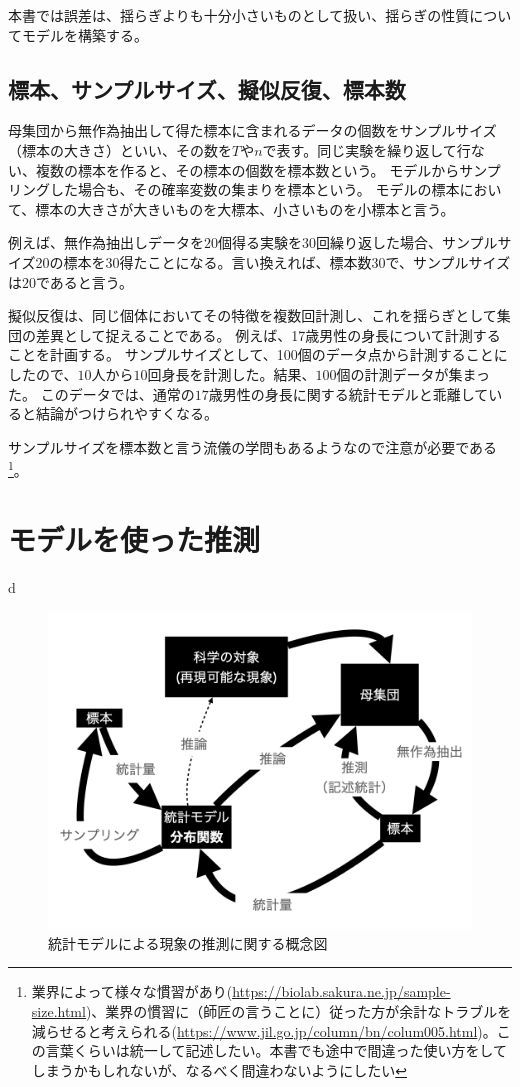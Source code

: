 本書では誤差は、揺らぎよりも十分小さいものとして扱い、揺らぎの性質についてモデルを構築する。

\subsection{標本、サンプルサイズ、擬似反復、標本数}
\begin{defi}
母集団から無作為抽出して得た標本に含まれるデータの個数をサンプルサイズ（標本の大きさ）といい、その数を$T$や$n$で表す。同じ実験を繰り返して行ない、複数の標本を作ると、その標本の個数を標本数という。
モデルからサンプリングした場合も、その確率変数の集まりを標本という。
モデルの標本において、標本の大きさが大きいものを大標本、小さいものを小標本と言う。
\end{defi}
例えば、無作為抽出しデータを$20$個得る実験を30回繰り返した場合、サンプルサイズ$20$の標本を$30$得たことになる。言い換えれば、標本数$30$で、サンプルサイズは$20$であると言う。


擬似反復は、同じ個体においてその特徴を複数回計測し、これを揺らぎとして集団の差異として捉えることである。
例えば、17歳男性の身長について計測することを計画する。
サンプルサイズとして、100個のデータ点から計測することにしたので、$10$人から$10$回身長を計測した。結果、$100$個の計測データが集まった。
このデータでは、通常の$17$歳男性の身長に関する統計モデルと乖離していると結論がつけられやすくなる。



サンプルサイズを標本数と言う流儀の学問もあるようなので注意が必要である
\footnote{業界によって様々な慣習があり(\url{https://biolab.sakura.ne.jp/sample-size.html})、業界の慣習に（師匠の言うことに）従った方が余計なトラブルを減らせると考えられる(\url{https://www.jil.go.jp/column/bn/colum005.html})。この言葉くらいは統一して記述したい。本書でも途中で間違った使い方をしてしまうかもしれないが、なるべく間違わないようにしたい}。


\section{モデルを使った推測}
d

\begin{figure}
    \begin{center}
        \includegraphics[width=15cm]{./image/01_/conceptual_diagram/conceptual_diagram.002.png}
        \caption{統計モデルによる現象の推測に関する概念図}
        \label{fig:conceptual_diagram_statistics}
    \end{center}
\end{figure}
    

